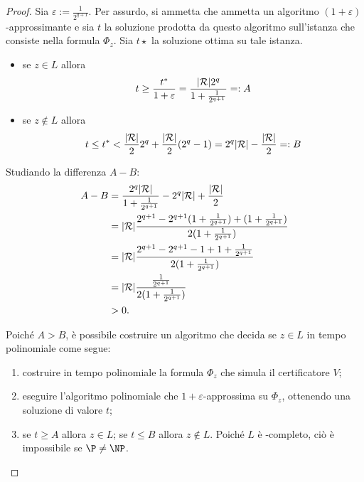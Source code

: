 \begin{proof}
	Sia $\varepsilon:=\frac{1}{2^{q+1}}$.
	Per assurdo, si ammetta che \MaxSat ammetta un algoritmo $(1+\varepsilon)$-approssimante e sia $t$ la soluzione prodotta da questo algoritmo sull'istanza che consiste nella formula $\Phi_z$.
	Sia $t\star$ la soluzione ottima su tale istanza.
	\begin{itemize}
		\item se $z\in L$ allora
		      \begin{equation*}
			      t \geq \frac{t^*}{1+\varepsilon} = \frac{| \mathcal R | 2^q}{1+\frac{1}{2^{q+1}}} =: A
		      \end{equation*}
		\item se $z\notin L$ allora
		      \begin{equation*}
			      t \leq t^* < \frac{| \mathcal R |}{2}2^q+\frac{| \mathcal R |}{2}(2^q-1) = 2^q| \mathcal R |-\frac{| \mathcal R |}{2} =: B
		      \end{equation*}
	\end{itemize}
	Studiando la differenza $A-B$:
	\begin{align*}
		A-B & = \frac{2^q| \mathcal R |}{1+\frac{1}{2^{q+1}}} - 2^q| \mathcal R |+\frac{| \mathcal R |}{2}                           \\
		    & = | \mathcal R | \frac{2^{q+1} - 2^{q+1}(1+\frac{1}{2^{q+1}}) + (1+\frac{1}{2^{q+1}})}{2(1+\frac{1}{2^{q+1}})} \\
		    & = | \mathcal R | \frac{2^{q+1} - 2^{q+1}-1 + 1+\frac{1}{2^{q+1}}}{2(1+\frac{1}{2^{q+1}})}                      \\
		    & = | \mathcal R | \frac{\frac{1}{2^{q+1}}}{2(1 + \frac{1}{2^{q+1}})}                                            \\
		    & > 0 \text.
	\end{align*}

	Poiché $A>B$, è possibile costruire un algoritmo che decida se $z\in L$ in tempo polinomiale come segue:
	\begin{enumerate}
		\item costruire in tempo polinomiale la formula $\Phi_z$ che simula il certificatore $V$;
		\item eseguire l'algoritmo polinomiale che $1+\varepsilon$-approssima \MaxSat su $\Phi_z$, ottenendo una soluzione di valore $t$;
		\item se $t\geq A$ allora $z\in L$; se $t\leq B$ allora $z\notin L$.
		      Poiché $L$ è \NP-completo, ciò è impossibile se $\P\neq\NP$.
	\end{enumerate}
\end{proof}


